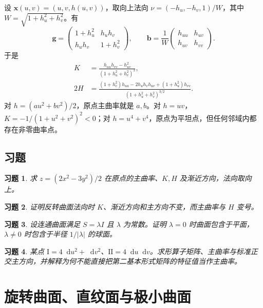 \documentclass[UTF8,12pt,a4paper,fontset=fandol]{ctexbook}
\newcommand{\dd}{\mathop{}\!\mathrm d}
\newtheorem{exercise}{习题}[chapter]
\begin{document}
\begin{example}[图像的曲率公式]\label{exam:dg-graph-curvature}
设 $\mathbf x(u,v)=(u,v,h(u,v))$，取向上法向 $\nu=(-h_u,-h_v,1)/W$，其中 $W=\sqrt{1+h_u^2+h_v^2}$。有
\[
 \mathbf g=\begin{pmatrix}1+h_u^2&h_uh_v\\h_uh_v&1+h_v^2\end{pmatrix},\qquad
 \mathbf b=\frac1W\begin{pmatrix}h_{uu}&h_{uv}\\h_{uv}&h_{vv}\end{pmatrix}.
\]
于是
\begin{align}
 K&=\frac{h_{uu}h_{vv}-h_{uv}^2}{(1+h_u^2+h_v^2)^2},\label{eq:dg-graph-K}\\
 2H&=\frac{(1+h_v^2)h_{uu}-2h_uh_vh_{uv}+(1+h_u^2)h_{vv}}
 {(1+h_u^2+h_v^2)^{3/2}}.\label{eq:dg-graph-H}
\end{align}
对 $h=(au^2+bv^2)/2$，原点主曲率就是 $a,b$。对 $h=uv$，$K=-1/(1+u^2+v^2)^2<0$；对 $h=u^4+v^4$，原点为平坦点，但任何邻域内都存在非零曲率点。
\end{example}

\section{习题}
\begin{exercise}\label{ex:dg-curvature-quadric}
求 $z=(2x^2-3y^2)/2$ 在原点的主曲率、$K,H$ 及渐近方向，法向取向上。
\end{exercise}
\begin{exercise}\label{ex:dg-curvature-normal}
证明反转曲面法向时 $K$、渐近方向和主方向不变，而主曲率与 $H$ 变号。
\end{exercise}
\begin{exercise}\label{ex:dg-curvature-umbilic}
设连通曲面满足 $S=\lambda I$ 且 $\lambda$ 为常数。证明 $\lambda=0$ 时曲面包含于平面，$\lambda\ne0$ 时包含于半径 $1/|\lambda|$ 的球面。
\end{exercise}
\begin{exercise}\label{ex:dg-curvature-matrices}
某点 $\mathrm I=4\dd u^2+\dd v^2$、$\mathrm{II}=4\dd u\dd v$。求形算子矩阵、主曲率与标准正交主方向，并解释为何不能直接把第二基本形式矩阵的特征值当作主曲率。
\end{exercise}

\chapter{旋转曲面、直纹面与极小曲面}
\label{chap:dg-examples}
\end{document}
